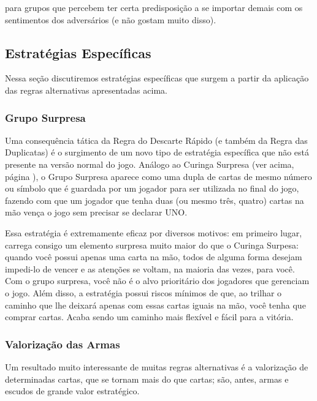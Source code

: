 para grupos que percebem ter certa predisposição a se importar demais com os sentimentos dos adversários (e não gostam muito disso).

\subsection{Estratégias Específicas}

Nessa seção discutiremos estratégias específicas que surgem a partir da aplicação das regras alternativas apresentadas acima.

\subsubsection{Grupo Surpresa}

\label{gruposurpresa}

Uma consequência tática da Regra do Descarte Rápido (e também da Regra das Duplicatas) é o surgimento de um novo tipo de estratégia específica que não está presente na versão normal do jogo. Análogo ao Curinga Surpresa (ver acima, página \pageref{curingasurpresa}), o Grupo Surpresa aparece como uma dupla de cartas de mesmo número ou símbolo que é guardada por um jogador para ser utilizada no final do jogo, fazendo com que um jogador que tenha duas (ou mesmo três, quatro) cartas na mão vença o jogo sem precisar se declarar UNO.

Essa estratégia é extremamente eficaz por diversos motivos: em primeiro lugar, carrega consigo um elemento surpresa muito maior do que o Curinga Surpesa: quando você possui apenas uma carta na mão, todos de alguma forma desejam impedi-lo de vencer e as atenções se voltam, na maioria das vezes, para você. Com o grupo surpresa, você não é o alvo prioritário dos jogadores que gerenciam o jogo. Além disso, a estratégia possui riscos mínimos de que, ao trilhar o caminho que lhe deixará apenas com essas cartas iguais na mão, você tenha que comprar cartas. Acaba sendo um caminho mais flexível e fácil para a vitória.

\subsubsection{Valorização das Armas}

\label{armas}

Um resultado muito interessante de muitas regras alternativas é a valorização de determinadas cartas, que se tornam mais do que cartas; são, antes, armas e escudos de grande valor estratégico.

